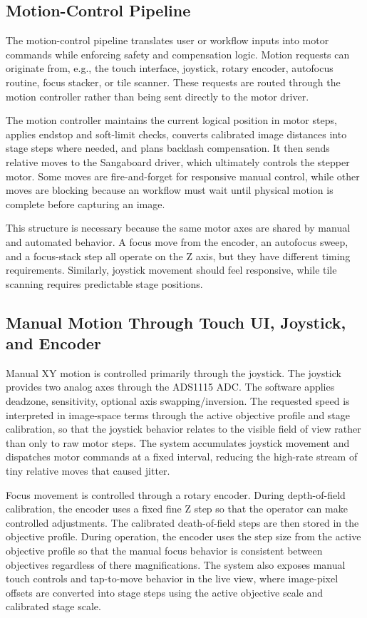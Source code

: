 \subsection{Motion-Control Pipeline}

The motion-control pipeline translates user or workflow inputs into motor commands while enforcing safety and compensation logic. Motion requests can originate from, e.g., the touch interface, joystick, rotary encoder, autofocus routine, focus stacker, or tile scanner. These requests are routed through the motion controller rather than being sent directly to the motor driver.

The motion controller maintains the current logical position in motor steps, applies endstop and soft-limit checks, converts calibrated image distances into stage steps where needed, and plans backlash compensation. It then sends relative moves to the Sangaboard driver, which ultimately controls the stepper motor. Some moves are fire-and-forget for responsive manual control, while other moves are blocking because an workflow must wait until physical motion is complete before capturing an image.

This structure is necessary because the same motor axes are shared by manual and automated behavior. A focus move from the encoder, an autofocus sweep, and a focus-stack step all operate on the Z axis, but they have different timing requirements. Similarly, joystick movement should feel responsive, while tile scanning requires predictable stage positions.

\subsection{Manual Motion Through Touch UI, Joystick, and Encoder}

Manual XY motion is controlled primarily through the joystick. The joystick provides two analog axes through the ADS1115 ADC. The software applies deadzone, sensitivity, optional axis swapping/inversion. The requested speed is interpreted in image-space terms through the active objective profile and stage calibration, so that the joystick behavior relates to the visible field of view rather than only to raw motor steps. The system accumulates joystick movement and dispatches motor commands at a fixed interval, reducing the high-rate stream of tiny relative moves that caused jitter.

Focus movement is controlled through a rotary encoder. During depth-of-field calibration, the encoder uses a fixed fine Z step so that the operator can make controlled adjustments. The calibrated death-of-field steps are then stored in the objective profile. During operation, the encoder uses the step size from the active objective profile so that the manual focus behavior is consistent between objectives regardless of there magnifications. The system also exposes manual touch controls and tap-to-move behavior in the live view, where image-pixel offsets are converted into stage steps using the active objective scale and calibrated stage scale.

